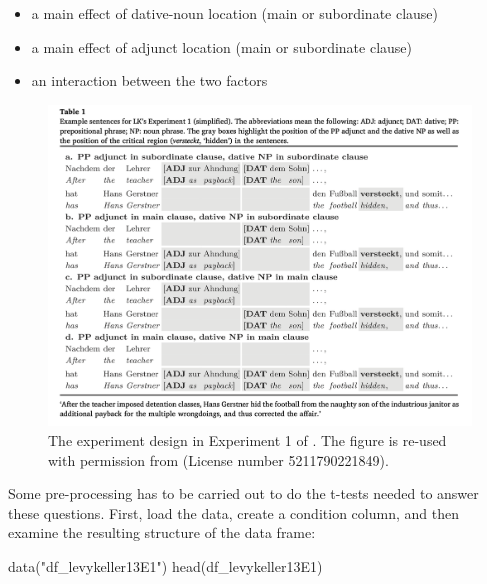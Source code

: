 \documentclass[
  12pt,
]{krantz}
\newenvironment{Shaded}{\begin{snugshade}}{\end{snugshade}}
\newcommand{\FunctionTok}[1]{\textcolor[rgb]{0.00,0.00,0.00}{#1}}
\newcommand{\NormalTok}[1]{#1}
\newcommand{\StringTok}[1]{\textcolor[rgb]{0.31,0.60,0.02}{#1}}
\providecommand{\tightlist}{%
  \setlength{\itemsep}{0pt}\setlength{\parskip}{0pt}}
\theoremstyle{definition}
\theoremstyle{definition}
\theoremstyle{definition}
\theoremstyle{definition}
\theoremstyle{remark}
\begin{document}
\begin{itemize}
\tightlist
\item
  a main effect of dative-noun location (main or subordinate clause)
\item
  a main effect of adjunct location (main or subordinate clause)
\item
  an interaction between the two factors
\end{itemize}



\begin{figure}

{\centering \includegraphics[width=0.99\linewidth]{figures/lk13E1} 

}

\caption{The experiment design in Experiment 1 of \citet{levy2013expectation}. The figure is re-used with permission from \citet{VasishthMertzenJaegerGelman2018} (License number 5211790221849).}\label{fig:lk13E1}
\end{figure}

Some pre-processing has to be carried out to do the t-tests needed to answer these questions. First, load the data, create a condition column, and then examine the resulting structure of the data frame:

\begin{Shaded}
\begin{Highlighting}[]
\FunctionTok{data}\NormalTok{(}\StringTok{"df\_levykeller13E1"}\NormalTok{)}
\FunctionTok{head}\NormalTok{(df\_levykeller13E1)}
\end{Highlighting}
\end{Shaded}
\end{document}
